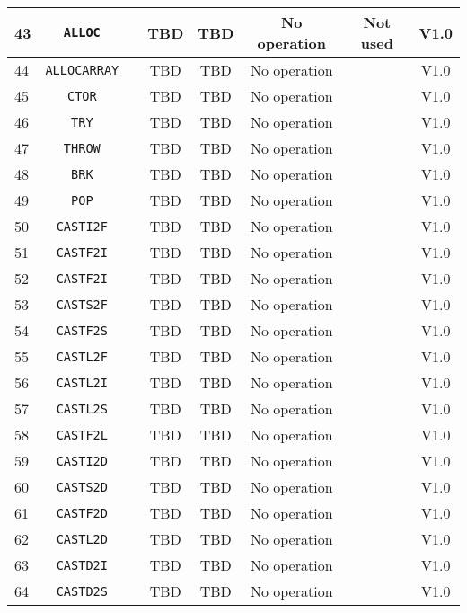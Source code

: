 \documentclass{article}
\begin{document}
\begin{longtable}{|l|c|c|c|c|c|c|c|}
		43 & \texttt{ALLOC} & & TBD & TBD & No operation & Not used & \textsf{V1.0} \\ \hline
		44 & \texttt{ALLOCARRAY} & & TBD & TBD & No operation & & \textsf{V1.0} \\ \hline
		45 & \texttt{CTOR} & & TBD & TBD & No operation & & \textsf{V1.0} \\ \hline
		46 & \texttt{TRY} & & TBD & TBD & No operation & & \textsf{V1.0} \\ \hline
		47 & \texttt{THROW} & & TBD & TBD & No operation & & \textsf{V1.0} \\ \hline
		48 & \texttt{BRK} & & TBD & TBD & No operation & & \textsf{V1.0} \\ \hline
		49 & \texttt{POP} & & TBD & TBD & No operation & & \textsf{V1.0} \\ \hline
		50 & \texttt{CASTI2F} & & TBD & TBD & No operation & & \textsf{V1.0} \\ \hline
		51 & \texttt{CASTF2I} & & TBD & TBD & No operation & & \textsf{V1.0} \\ \hline
		52 & \texttt{CASTF2I} & & TBD & TBD & No operation & & \textsf{V1.0} \\ \hline
		53 & \texttt{CASTS2F} & & TBD & TBD & No operation & & \textsf{V1.0} \\ \hline
		54 & \texttt{CASTF2S} & & TBD & TBD & No operation & & \textsf{V1.0} \\ \hline
		55 & \texttt{CASTL2F} & & TBD & TBD & No operation & & \textsf{V1.0} \\ \hline
		56 & \texttt{CASTL2I} & & TBD & TBD & No operation & & \textsf{V1.0} \\ \hline
		57 & \texttt{CASTL2S} & & TBD & TBD & No operation & & \textsf{V1.0} \\ \hline
		58 & \texttt{CASTF2L} & & TBD & TBD & No operation & & \textsf{V1.0} \\ \hline
		59 & \texttt{CASTI2D} & & TBD & TBD & No operation & & \textsf{V1.0} \\ \hline
		60 & \texttt{CASTS2D} & & TBD & TBD & No operation & & \textsf{V1.0} \\ \hline
		61 & \texttt{CASTF2D} & & TBD & TBD & No operation & & \textsf{V1.0} \\ \hline
		62 & \texttt{CASTL2D} & & TBD & TBD & No operation & & \textsf{V1.0} \\ \hline
		63 & \texttt{CASTD2I} & & TBD & TBD & No operation & & \textsf{V1.0} \\ \hline
		64 & \texttt{CASTD2S} & & TBD & TBD & No operation & & \textsf{V1.0} \\ \hline

\end{longtable}
\end{document}
